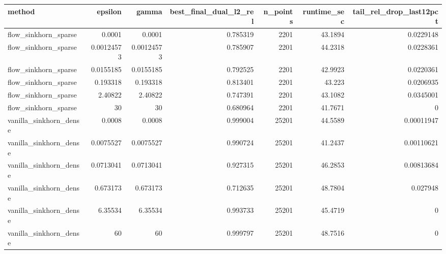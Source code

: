 \begin{tabular}{lrrrrrr}
\toprule
method & epsilon & gamma & best\_final\_dual\_l2\_rel & n\_points & runtime\_sec & tail\_rel\_drop\_last12pct \\
\midrule
flow\_sinkhorn\_sparse & 0.0001 & 0.0001 & 0.785319 & 2201 & 43.1894 & 0.0229148 \\
flow\_sinkhorn\_sparse & 0.00124573 & 0.00124573 & 0.785907 & 2201 & 44.2318 & 0.0228361 \\
flow\_sinkhorn\_sparse & 0.0155185 & 0.0155185 & 0.792525 & 2201 & 42.9923 & 0.0220361 \\
flow\_sinkhorn\_sparse & 0.193318 & 0.193318 & 0.813401 & 2201 & 43.223 & 0.0206935 \\
flow\_sinkhorn\_sparse & 2.40822 & 2.40822 & 0.747391 & 2201 & 43.1082 & 0.0345001 \\
flow\_sinkhorn\_sparse & 30 & 30 & 0.680964 & 2201 & 41.7671 & 0 \\
vanilla\_sinkhorn\_dense & 0.0008 & 0.0008 & 0.999004 & 25201 & 44.5589 & 0.00011947 \\
vanilla\_sinkhorn\_dense & 0.0075527 & 0.0075527 & 0.990724 & 25201 & 41.2437 & 0.00110621 \\
vanilla\_sinkhorn\_dense & 0.0713041 & 0.0713041 & 0.927315 & 25201 & 46.2853 & 0.00813684 \\
vanilla\_sinkhorn\_dense & 0.673173 & 0.673173 & 0.712635 & 25201 & 48.7804 & 0.027948 \\
vanilla\_sinkhorn\_dense & 6.35534 & 6.35534 & 0.993733 & 25201 & 45.4719 & 0 \\
vanilla\_sinkhorn\_dense & 60 & 60 & 0.999797 & 25201 & 48.7516 & 0 \\
\bottomrule
\end{tabular}
